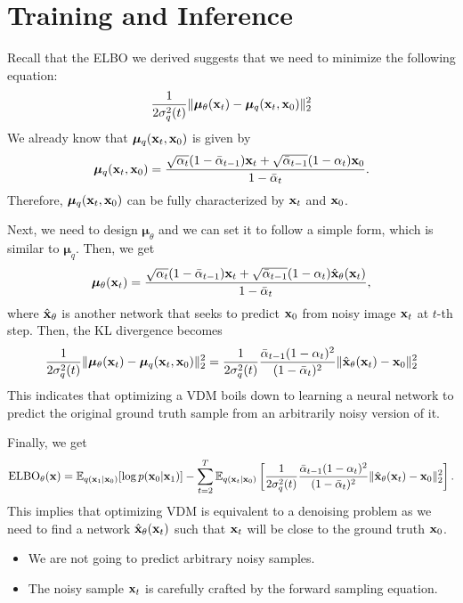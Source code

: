 \section{Training and Inference}
Recall that the ELBO we derived suggests that we need to minimize the following equation:
\begin{align*}
	\frac{1}{2\sigma^2_q(t)}\|\boldsymbol{\mu}_\theta({\mathbf{x}}_t)- \boldsymbol{\mu}_q({\mathbf{x}}_t, {\mathbf{x}}_0)\|^2_2
\end{align*}
We already know that $\boldsymbol{\mu}_q({\mathbf{x}}_t,{\mathbf{x}}_0)$ is given by
\begin{align*}
	\boldsymbol{\mu}_q({\mathbf{x}}_t,{\mathbf{x}}_0) = \frac{\sqrt{{\alpha}_{t}}(1-\bar{\alpha}_{t-1}){\mathbf{x}}_t+\sqrt{\bar{\alpha}_{t-1}}(1-{\alpha}_{t}){\mathbf{x}}_0}{1-\bar{\alpha}_{t}}.
\end{align*}
Therefore, $\boldsymbol{\mu}_q({\mathbf{x}}_t,{\mathbf{x}}_0)$ can be fully characterized by ${\mathbf{x}}_t$ and ${\mathbf{x}}_0$.

Next, we need to design $\boldsymbol{\mu}_\theta$ and we can set it to follow a simple form, which is similar to $\boldsymbol{\mu}_q$. Then, we get
\begin{align*}
	\boldsymbol{\mu}_\theta({\mathbf{x}}_t) = \frac{\sqrt{{\alpha}_{t}}(1-\bar{\alpha}_{t-1}){\mathbf{x}}_t+\sqrt{\bar{\alpha}_{t-1}}(1-{\alpha}_{t})\hat{{\mathbf{x}}}_\theta({\mathbf{x}}_t)}{1-\bar{\alpha}_{t}},
\end{align*}
where $\hat{{\mathbf{x}}}_\theta$ is another network that seeks to predict ${\mathbf{x}}_0$ from noisy image ${\mathbf{x}}_t$ at $t$-th step. Then, the KL divergence becomes
\begin{align*}
	\frac{1}{2\sigma^2_q(t)}\|\boldsymbol{\mu}_\theta({\mathbf{x}}_t)- \boldsymbol{\mu}_q({\mathbf{x}}_t, {\mathbf{x}}_0)\|^2_2 = \frac{1}{2\sigma^2_q(t)}\frac{\bar{\alpha}_{t-1}(1-{\alpha}_{t})^2}{(1-\bar{\alpha}_{t})^2}\|\hat{{\mathbf{x}}}_\theta({\mathbf{x}}_t)-{\mathbf{x}}_0\|^2_2
\end{align*}
This indicates that optimizing a VDM boils down to learning a neural network to predict the original ground truth sample from an arbitrarily noisy version of it.

Finally, we get 
\begin{align*}
	\text{ELBO}_\theta({\mathbf{x}}) = \mathbb{E}_{q({\mathbf{x}}_{1}|{\mathbf{x}}_0)}[\log p({\mathbf{x}}_0|{\mathbf{x}}_{1})] -\sum_{t=2}^{T}\mathbb{E}_{q({\mathbf{x}}_{t}|{\mathbf{x}}_0)}\left[\frac{1}{2\sigma^2_q(t)}\frac{\bar{\alpha}_{t-1}(1-{\alpha}_{t})^2}{(1-\bar{\alpha}_{t})^2}\|\hat{{\mathbf{x}}}_\theta({\mathbf{x}}_t)-{\mathbf{x}}_0\|^2_2\right].
\end{align*}
This implies that optimizing VDM is equivalent to a denoising problem as we need to find a network  $\hat{{\mathbf{x}}}_\theta({\mathbf{x}}_t)$ such that ${\mathbf{x}}_t$ will be close to the ground truth ${\mathbf{x}}_0$.
\begin{itemize}
	\item We are not going to predict arbitrary noisy samples. 
	\item The noisy sample ${\mathbf{x}}_t$ is carefully crafted by the forward sampling equation. 
\end{itemize}


